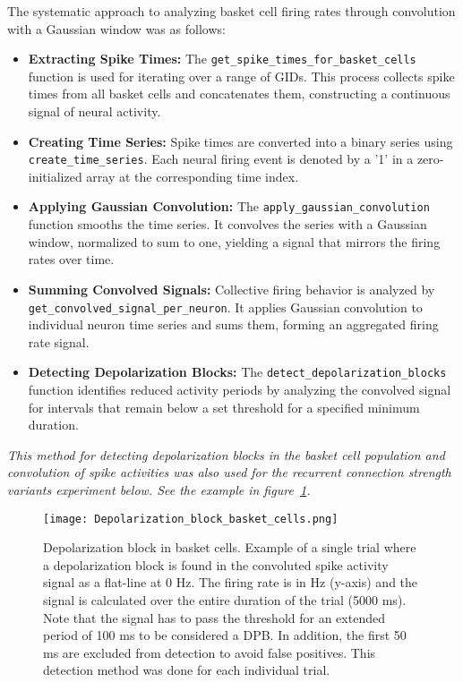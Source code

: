 \noindent The systematic approach to analyzing basket cell firing rates through convolution with a Gaussian window was as follows:
\begin{itemize}
    \item \textbf{Extracting Spike Times:} The \lstinline{get_spike_times_for_basket_cells}
          function is used for iterating over a range of GIDs. This process collects spike times from
          all basket cells and concatenates them, constructing a continuous signal of neural activity.

    \item \textbf{Creating Time Series:} Spike times are converted into a binary series
          using \lstinline{create_time_series}. Each neural firing event is denoted by a '1' in a
          zero-initialized array at the corresponding time index.

    \item \textbf{Applying Gaussian Convolution:} The \lstinline{apply_gaussian_convolution}\newline
          function smooths the time series. It convolves the series with a Gaussian window, normalized
          to sum to one, yielding a signal that mirrors the firing rates over time.

    \item \textbf{Summing Convolved Signals:} Collective firing behavior is analyzed by
          \lstinline{get_convolved_signal_per_neuron}. It applies Gaussian convolution to individual
          neuron time series and sums them, forming an aggregated firing rate signal.

    \item \textbf{Detecting Depolarization Blocks:} The \lstinline{detect_depolarization_blocks}
          function identifies reduced activity periods by analyzing the convolved signal for intervals
          that remain below a set threshold for a specified minimum duration.
\end{itemize}

\noindent
\textit{This method for detecting depolarization blocks in the basket cell population
    and convolution of spike activities was also used for the recurrent
    connection strength variants experiment below. See the example in figure~\ref{fig:depolarization_block_basket_cells}.}

\begin{figure}[htbp]
    \centering
    \texttt{[image: Depolarization\_block\_basket\_cells.png]}
    \caption[Depolarization block in basket cells]{Depolarization block in basket cells. Example of a single trial where a depolarization block is found in the convoluted spike activity signal as a flat-line at 0 Hz. The firing rate is in Hz (y-axis) and the signal is calculated over the entire duration of the trial (5000 ms).
    Note that the signal has to pass the threshold for an extended period of 100 ms to be considered a DPB\@.
    In addition, the first 50 ms are excluded from detection to avoid false positives. This detection method was done for each individual trial.}\label{fig:depolarization_block_basket_cells}
\end{figure}
\pagebreak

